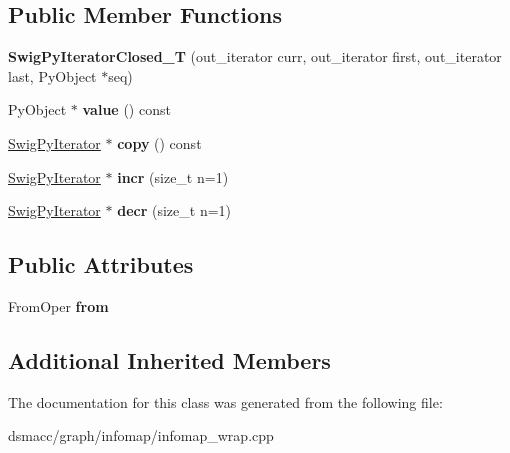 \subsection*{Public Member Functions}
\begin{DoxyCompactItemize}
\item 
\mbox{\label{classswig_1_1SwigPyIteratorClosed__T_ae23b1da812fe9a789dcbc18b4db5ffe9}} 
{\bfseries Swig\+Py\+Iterator\+Closed\+\_\+T} (out\+\_\+iterator curr, out\+\_\+iterator first, out\+\_\+iterator last, Py\+Object $\ast$seq)
\item 
\mbox{\label{classswig_1_1SwigPyIteratorClosed__T_a4baeeb91419a21260b89205f325e0566}} 
Py\+Object $\ast$ {\bfseries value} () const
\item 
\mbox{\label{classswig_1_1SwigPyIteratorClosed__T_afa43a5af55b0f4ddee56308cb6c72eba}} 
\mbox{\hyperlink{structswig_1_1SwigPyIterator}{Swig\+Py\+Iterator}} $\ast$ {\bfseries copy} () const
\item 
\mbox{\label{classswig_1_1SwigPyIteratorClosed__T_a1bf667d0f643064b452ecb2fc5e48df2}} 
\mbox{\hyperlink{structswig_1_1SwigPyIterator}{Swig\+Py\+Iterator}} $\ast$ {\bfseries incr} (size\+\_\+t n=1)
\item 
\mbox{\label{classswig_1_1SwigPyIteratorClosed__T_aafae78acb63a1c4acaf2a76d4e9f6267}} 
\mbox{\hyperlink{structswig_1_1SwigPyIterator}{Swig\+Py\+Iterator}} $\ast$ {\bfseries decr} (size\+\_\+t n=1)
\end{DoxyCompactItemize}
\subsection*{Public Attributes}
\begin{DoxyCompactItemize}
\item 
\mbox{\label{classswig_1_1SwigPyIteratorClosed__T_a8a87b95d1e7e7d0784866dc71189575d}} 
From\+Oper {\bfseries from}
\end{DoxyCompactItemize}
\subsection*{Additional Inherited Members}


The documentation for this class was generated from the following file\+:\begin{DoxyCompactItemize}
\item 
dsmacc/graph/infomap/infomap\+\_\+wrap.\+cpp\end{DoxyCompactItemize}
